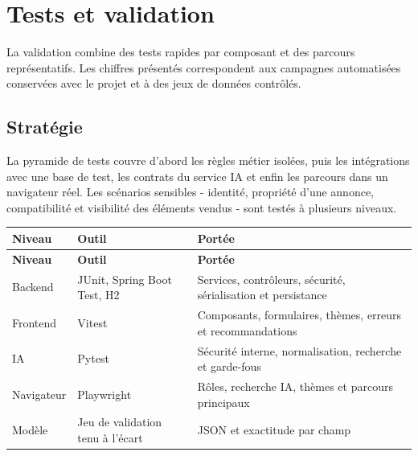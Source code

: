 \chapter{Tests et validation}

La validation combine des tests rapides par composant et des parcours représentatifs. Les chiffres présentés correspondent aux campagnes automatisées conservées avec le projet et à des jeux de données contrôlés.


\section{Stratégie}

La pyramide de tests couvre d'abord les règles métier isolées, puis les intégrations avec une base de test, les contrats du service IA et enfin les parcours dans un navigateur réel. Les scénarios sensibles - identité, propriété d'une annonce, compatibilité et visibilité des éléments vendus - sont testés à plusieurs niveaux.


{\small\singlespacing{}
\begin{longtable}{|>{\raggedright\arraybackslash}p{}|>{\raggedright\arraybackslash}p{}|>{\raggedright\arraybackslash}p{}|}
\hline
\rowcolor{tablehead} \color{white}\bfseries Niveau & \color{white}\bfseries Outil & \color{white}\bfseries Portée \\ \hline
\endfirsthead
\rowcolor{tablehead} \color{white}\bfseries Niveau & \color{white}\bfseries Outil & \color{white}\bfseries Portée \\ \hline
\endhead
\hline\endfoot
Backend & JUnit, Spring Boot Test, H2 & Services, contrôleurs, sécurité, sérialisation et persistance \\ \hline
\rowcolor{tablerow} Frontend & Vitest & Composants, formulaires, thèmes, erreurs et recommandations \\ \hline
IA & Pytest & Sécurité interne, normalisation, recherche et garde-fous \\ \hline
\rowcolor{tablerow} Navigateur & Playwright & Rôles, recherche IA, thèmes et parcours principaux \\ \hline
Modèle & Jeu de validation tenu à l'écart & JSON et exactitude par champ \\ \hline
\end{longtable}
}


